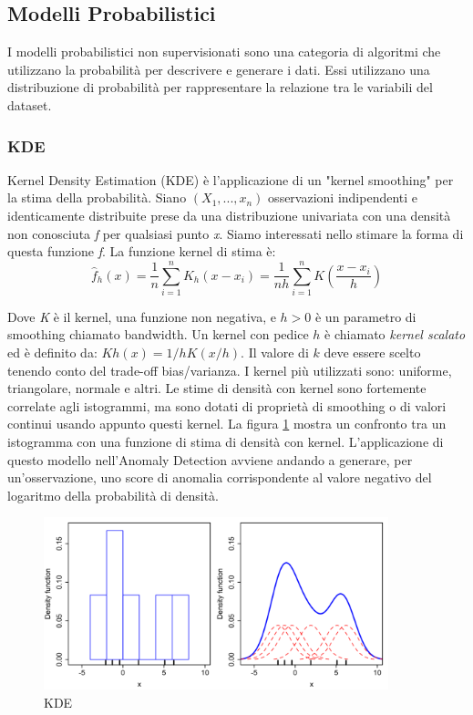\subsection{Modelli Probabilistici}
I modelli probabilistici non supervisionati sono una categoria di algoritmi che utilizzano la probabilità per descrivere e generare i dati. Essi utilizzano una distribuzione di probabilità per rappresentare la relazione tra le variabili del dataset.
\subsubsection{KDE}
Kernel Density Estimation (KDE) \cite{latecki2007outlier} è l'applicazione di un "kernel smoothing" per la stima della probabilità. 
Siano $(X_1,...,x_n)$ osservazioni indipendenti e identicamente distribuite prese da una distribuzione univariata con una densità non conosciuta \textit{f} per qualsiasi punto \textit{x}. Siamo interessati nello stimare la forma di questa funzione \textit{f}. La funzione kernel di stima è:
\[\widehat{f}_h(x)=\frac{1}{n} \sum_{i=1}^n K_h\left(x-x_i\right)=\frac{1}{n h} \sum_{i=1}^n K\left(\frac{x-x_i}{h}\right)\]

Dove \textit{K} è il kernel, una funzione non negativa, e $h>0$ è un parametro di smoothing chiamato bandwidth. Un kernel con pedice $h$ è chiamato \textit{kernel scalato} ed è definito da: $Kh(x) = 1/h K(x/h)$. 
Il valore di $k$ deve essere scelto tenendo conto del trade-off bias/varianza.
I kernel più utilizzati sono: uniforme, triangolare, normale e altri.
Le stime di densità con kernel sono fortemente correlate agli istogrammi, ma sono dotati di proprietà di smoothing o di valori continui usando appunto questi kernel.
La figura \ref{kde_model} mostra un confronto tra un istogramma con una funzione di stima di densità con kernel.
L'applicazione di questo modello nell'Anomaly Detection avviene andando a generare, per un'osservazione, uno score di anomalia corrispondente al valore negativo del logaritmo della probabilità di densità.

\begin{figure}[t]
	\centering
	\includegraphics[width=10cm, scale=1]{images/kde_model}
	\caption{KDE}
	\label{kde_model}
\end{figure}


